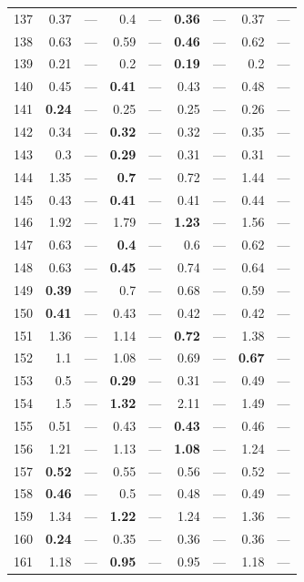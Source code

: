 \begin{longtable}{lr@{\hskip 4pt}l@{\hskip 12pt}r@{\hskip 4pt}l@{\hskip 12pt}r@{\hskip 4pt}l@{\hskip 12pt}r@{\hskip 4pt}l@{\hskip 12pt}}
137 & 0.37 & --- & 0.4 & --- & \textbf{0.36} & --- & 0.37 & --- \\
138 & 0.63 & --- & 0.59 & --- & \textbf{0.46} & --- & 0.62 & --- \\
139 & 0.21 & --- & 0.2 & --- & \textbf{0.19} & --- & 0.2 & --- \\
140 & 0.45 & --- & \textbf{0.41} & --- & 0.43 & --- & 0.48 & --- \\
141 & \textbf{0.24} & --- & 0.25 & --- & 0.25 & --- & 0.26 & --- \\
142 & 0.34 & --- & \textbf{0.32} & --- & 0.32 & --- & 0.35 & --- \\
143 & 0.3 & --- & \textbf{0.29} & --- & 0.31 & --- & 0.31 & --- \\
144 & 1.35 & --- & \textbf{0.7} & --- & 0.72 & --- & 1.44 & --- \\
145 & 0.43 & --- & \textbf{0.41} & --- & 0.41 & --- & 0.44 & --- \\
146 & 1.92 & --- & 1.79 & --- & \textbf{1.23} & --- & 1.56 & --- \\
147 & 0.63 & --- & \textbf{0.4} & --- & 0.6 & --- & 0.62 & --- \\
148 & 0.63 & --- & \textbf{0.45} & --- & 0.74 & --- & 0.64 & --- \\
149 & \textbf{0.39} & --- & 0.7 & --- & 0.68 & --- & 0.59 & --- \\
150 & \textbf{0.41} & --- & 0.43 & --- & 0.42 & --- & 0.42 & --- \\
151 & 1.36 & --- & 1.14 & --- & \textbf{0.72} & --- & 1.38 & --- \\
152 & 1.1 & --- & 1.08 & --- & 0.69 & --- & \textbf{0.67} & --- \\
153 & 0.5 & --- & \textbf{0.29} & --- & 0.31 & --- & 0.49 & --- \\
154 & 1.5 & --- & \textbf{1.32} & --- & 2.11 & --- & 1.49 & --- \\
155 & 0.51 & --- & 0.43 & --- & \textbf{0.43} & --- & 0.46 & --- \\
156 & 1.21 & --- & 1.13 & --- & \textbf{1.08} & --- & 1.24 & --- \\
157 & \textbf{0.52} & --- & 0.55 & --- & 0.56 & --- & 0.52 & --- \\
158 & \textbf{0.46} & --- & 0.5 & --- & 0.48 & --- & 0.49 & --- \\
159 & 1.34 & --- & \textbf{1.22} & --- & 1.24 & --- & 1.36 & --- \\
160 & \textbf{0.24} & --- & 0.35 & --- & 0.36 & --- & 0.36 & --- \\
161 & 1.18 & --- & \textbf{0.95} & --- & 0.95 & --- & 1.18 & --- \\

\end{longtable}
